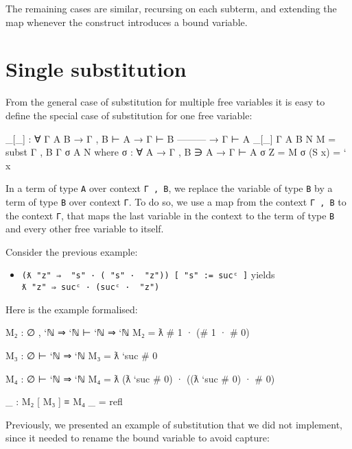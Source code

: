 The remaining cases are similar, recursing on each subterm, and
extending the map whenever the construct introduces a bound variable.

\hypertarget{single-substitution}{%
\section{Single substitution}\label{single-substitution}}

From the general case of substitution for multiple free variables it is
easy to define the special case of substitution for one free variable:

\begin{fence}
\begin{code}
_[_] : ∀ {Γ A B}
  → Γ , B ⊢ A
  → Γ ⊢ B
    ---------
  → Γ ⊢ A
_[_] {Γ} {A} {B} N M =  subst {Γ , B} {Γ} σ {A} N
  where
  σ : ∀ {A} → Γ , B ∋ A → Γ ⊢ A
  σ Z      =  M
  σ (S x)  =  ` x
\end{code}
\end{fence}

In a term of type \texttt{A} over context \texttt{Γ\ ,\ B}, we replace
the variable of type \texttt{B} by a term of type \texttt{B} over
context \texttt{Γ}. To do so, we use a map from the context
\texttt{Γ\ ,\ B} to the context \texttt{Γ}, that maps the last variable
in the context to the term of type \texttt{B} and every other free
variable to itself.

Consider the previous example:

\begin{itemize}
\tightlist
\item
  \texttt{(ƛ\ "z"\ ⇒\ \textasciigrave{}\ "s"\ ·\ (\textasciigrave{}\ "s"\ ·\ \textasciigrave{}\ "z"))\ {[}\ "s"\ :=\ sucᶜ\ {]}}
  yields \texttt{ƛ\ "z"\ ⇒\ sucᶜ\ ·\ (sucᶜ\ ·\ \textasciigrave{}\ "z")}
\end{itemize}

Here is the example formalised:

\begin{fence}
\begin{code}
M₂ : ∅ , `ℕ ⇒ `ℕ ⊢ `ℕ ⇒ `ℕ
M₂ = ƛ # 1 · (# 1 · # 0)

M₃ : ∅ ⊢ `ℕ ⇒ `ℕ
M₃ = ƛ `suc # 0

M₄ : ∅ ⊢ `ℕ ⇒ `ℕ
M₄ = ƛ (ƛ `suc # 0) · ((ƛ `suc # 0) · # 0)

_ : M₂ [ M₃ ] ≡ M₄
_ = refl
\end{code}
\end{fence}

Previously, we presented an example of substitution that we did not
implement, since it needed to rename the bound variable to avoid
capture:

